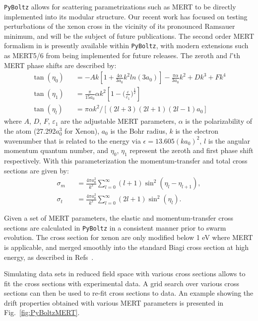 \documentclass[3p,11pt]{elsarticle}
\begin{document}
{\tt PyBoltz} allows for scattering parametrizations such as MERT to be directly implemented into its modular structure. Our recent work has focused on testing perturbations of the xenon cross in the vicinity of its pronounced Ramsauer minimum, and will be the subject of future publications. The second order MERT formalism in \cite{HunterLow1988} is presently available within  {\tt PyBoltz}, with modern extensions such as MERT5/6 from \cite{kurokawa2011high} being implemented for future releases.
The zeroth and $l$'th MERT phase shifts are described by:
\begin{eqnarray}
\tan(\eta_0) &&= -Ak[1+\frac{4\alpha}{3a_0}k^2ln(3a_0)]-\frac{\pi \alpha}{3a_0}k^2 + Dk^3+Fk^4\\
\tan(\eta_1) &&= \frac{\pi}{15 a_0} \alpha k^2 [1 - {\Big (\frac{\varepsilon}{\varepsilon_1} \Big )}^{\frac{1}{2}}]\\
\tan(\eta_l) &&= \pi \alpha k^2 / [(2l+3)(2l+1)(2l-1)a_0]
\end{eqnarray}
where $A$, $D$, $F$, $\varepsilon_1$ are the adjustable MERT parameters, $\alpha$ is the polarizability of the atom (27.292$a_0^3$ for Xenon), $a_0$ is the Bohr radius, $k$ is the electron wavenumber that is related to the energy via $\epsilon = 13.605(ka_0)^2$, $l$ is the angular momentum quantum number, and $\eta_0$, $\eta_1$ represent the zeroth and first phase shift respectively.
With this parameterization the momentum-transfer and total cross sections are given by:
\begin{eqnarray}
\sigma_m  &&= \frac{4\pi a_0^2}{k^2} \sum_{l=0}^{\infty} (l+1)\sin^2(\eta_l-\eta_{l+1}),\\
\sigma_t  &&= \frac{4\pi a_0^2}{k^2} \sum_{l=0}^{\infty} (2l+1)\sin^2(\eta_l).
\end{eqnarray}

Given a set of MERT parameters, the elastic and momentum-transfer cross sections are calculated in {\tt PyBoltz} in a consistent manner prior to swarm evolution. The cross section for xenon are only modified below 1 eV where MERT is applicable, and merged smoothly into the standard Biagi cross section at high energy, as described in Refs~\cite{HunterLow1988,kurokawa2011high}. 

Simulating data sets in reduced field space with various cross sections allows to fit the cross sections with experimental data. A grid search over various cross sections can then be used to re-fit cross sections to data. An example showing the drift properties obtained with various MERT parameters is presented in Fig.~\ref{fig:PyBoltzMERT}.
\end{document}
